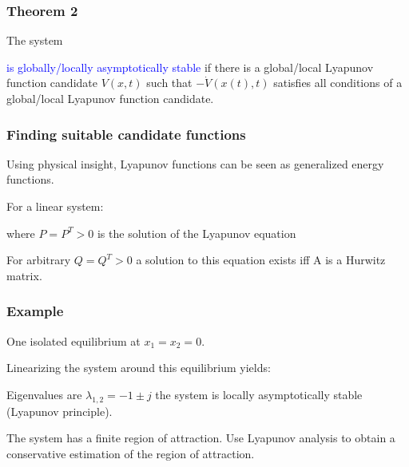 \documentclass[10pt,a4paper]{scrartcl}
\begin{document}
\begin{multicols*}{3}
\subsubsection{Theorem 2}

The system


\textcolor{blue}{is globally/locally asymptotically stable} if there is a global/local Lyapunov function candidate $V(x,t)$ such that $-\dot{V}(x(t),t)$ satisfies all conditions of a global/local Lyapunov function candidate.

\subsubsection{Finding suitable candidate functions}

Using physical insight, Lyapunov functions can be seen as generalized energy functions.

For a linear system:


where $P=P^T>0$ is the solution of the Lyapunov equation


For arbitrary $Q=Q^T>0$ a solution to this equation exists iff A is a Hurwitz matrix.


\subsubsection{Example}


One isolated equilibrium at $x_1=x_2=0$.

Linearizing the system around this equilibrium yields:


Eigenvalues are $\lambda_{1,2}=-1\pm j$ \dahe the system is locally asymptotically stable (Lyapunov principle).

\finn

The system has a finite region of attraction. Use Lyapunov analysis to obtain a conservative estimation of the region of attraction.


\end{multicols*}
\end{document}
